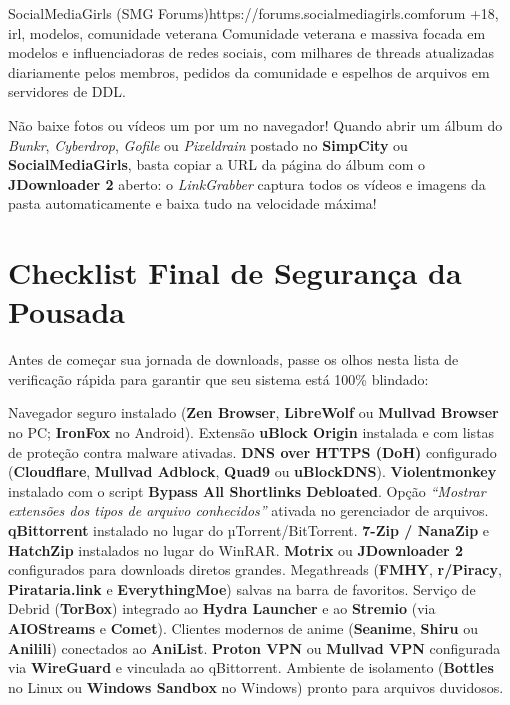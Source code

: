 \documentclass{pousadaguide}
\begin{document}
\begin{ferramenta}[recomendado,logo=socialmediagirls]{SocialMediaGirls (SMG Forums)}{https://forums.socialmediagirls.com}{forum +18, irl, modelos, comunidade veterana}
Comunidade veterana e massiva focada em modelos e influenciadoras de redes sociais, com milhares de threads atualizadas diariamente pelos membros, pedidos da comunidade e espelhos de arquivos em servidores de DDL. 
\end{ferramenta}

\begin{dica}
Não baixe fotos ou vídeos um por um no navegador! Quando abrir um álbum do \emph{Bunkr}, \emph{Cyberdrop}, \emph{Gofile} ou \emph{Pixeldrain} postado no \textbf{SimpCity} ou \textbf{SocialMediaGirls}, basta copiar a URL da página do álbum com o \textbf{JDownloader 2} aberto: o \emph{LinkGrabber} captura todos os vídeos e imagens da pasta automaticamente e baixa tudo na velocidade máxima!
\end{dica}

\section{Checklist Final de Segurança da Pousada}

Antes de começar sua jornada de downloads, passe os olhos nesta lista de verificação rápida para garantir que seu sistema está 100\% blindado:

\begin{checklist}
  \feito Navegador seguro instalado (\textbf{Zen Browser}, \textbf{LibreWolf} ou \textbf{Mullvad Browser} no PC; \textbf{IronFox} no Android).
  \feito Extensão \textbf{uBlock Origin} instalada e com listas de proteção contra malware ativadas.
  \feito \textbf{DNS over HTTPS (DoH)} configurado (\textbf{Cloudflare}, \textbf{Mullvad Adblock}, \textbf{Quad9} ou \textbf{uBlockDNS}).
  \feito \textbf{Violentmonkey} instalado com o script \textbf{Bypass All Shortlinks Debloated}.
  \feito Opção \emph{``Mostrar extensões dos tipos de arquivo conhecidos''} ativada no gerenciador de arquivos.
  \feito \textbf{qBittorrent} instalado no lugar do µTorrent/BitTorrent.
  \feito \textbf{7-Zip / NanaZip} e \textbf{HatchZip} instalados no lugar do WinRAR.
  \feito \textbf{Motrix} ou \textbf{JDownloader 2} configurados para downloads diretos grandes.
  \feito Megathreads (\textbf{FMHY}, \textbf{r/Piracy}, \textbf{Pirataria.link} e \textbf{EverythingMoe}) salvas na barra de favoritos.
  \opcional Serviço de Debrid (\textbf{TorBox}) integrado ao \textbf{Hydra Launcher} e ao \textbf{Stremio} (via \textbf{AIOStreams} e \textbf{Comet}).
  \opcional Clientes modernos de anime (\textbf{Seanime}, \textbf{Shiru} ou \textbf{Anilili}) conectados ao \textbf{AniList}.
  \opcional \textbf{Proton VPN} ou \textbf{Mullvad VPN} configurada via \textbf{WireGuard} e vinculada ao qBittorrent.
  \opcional Ambiente de isolamento (\textbf{Bottles} no Linux ou \textbf{Windows Sandbox} no Windows) pronto para arquivos duvidosos.
\end{checklist}
\end{document}
